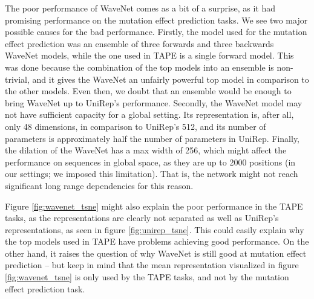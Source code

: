 The poor performance of WaveNet comes as a bit of a surprise, as it had promising performance on the mutation effect prediction tasks. We see two major possible causes for the bad performance. Firstly, the model used for the mutation effect prediction was an ensemble of three forwards and three backwards WaveNet models, while the one used in TAPE is a single forward model. This was done because the combination of the top models into an ensemble is non-trivial, and it gives the WaveNet an unfairly powerful top model in comparison to the other models. Even then, we doubt that an ensemble would be enough to bring WaveNet up to UniRep's performance. Secondly, the WaveNet model may not have sufficient capacity for a global setting. Its representation is, after all, only 48 dimensions, in comparison to UniRep's 512, and its number of parameters is approximately half the number of parameters in UniRep. Finally, the dilation of the WaveNet has a max width of 256, which might affect the performance on sequences in global space, as they are up to 2000 positions (in our settings; we imposed this limitation). That is, the network might not reach significant long range dependencies for this reason. %

Figure \ref{fig:wavenet_tsne} might also explain the poor performance in the TAPE tasks, as the representations are clearly not separated as well as UniRep's representations, as seen in figure \ref{fig:unirep_tsne}. This could easily explain why the top models used in TAPE have problems achieving good performance. On the other hand, it raises the question of why WaveNet is still good at mutation effect prediction -- but keep in mind that the mean representation visualized in figure \ref{fig:wavenet_tsne} is only used by the TAPE tasks, and not by the mutation effect prediction task.
